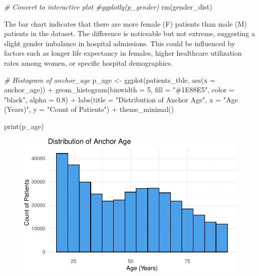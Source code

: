 \documentclass[
]{article}
\newenvironment{Shaded}{\begin{snugshade}}{\end{snugshade}}
\newcommand{\AttributeTok}[1]{\textcolor[rgb]{0.77,0.63,0.00}{#1}}
\newcommand{\CommentTok}[1]{\textcolor[rgb]{0.56,0.35,0.01}{\textit{#1}}}
\newcommand{\DecValTok}[1]{\textcolor[rgb]{0.00,0.00,0.81}{#1}}
\newcommand{\FloatTok}[1]{\textcolor[rgb]{0.00,0.00,0.81}{#1}}
\newcommand{\FunctionTok}[1]{\textcolor[rgb]{0.00,0.00,0.00}{#1}}
\newcommand{\NormalTok}[1]{\textcolor[rgb]{0.00,0.00,0.00}{#1}}
\newcommand{\OtherTok}[1]{\textcolor[rgb]{0.56,0.35,0.01}{#1}}
\newcommand{\SpecialCharTok}[1]{\textcolor[rgb]{0.00,0.00,0.00}{#1}}
\newcommand{\StringTok}[1]{\textcolor[rgb]{0.31,0.60,0.02}{#1}}
\begin{document}
\begin{Shaded}
\begin{Highlighting}[]
\CommentTok{\# Convert to interactive plot}
\CommentTok{\#ggplotly(p\_gender)}
\FunctionTok{rm}\NormalTok{(gender\_dist)}
\end{Highlighting}
\end{Shaded}

The bar chart indicates that there are more female (F) patients than
male (M) patients in the dataset. The difference is noticeable but not
extreme, suggesting a slight gender imbalance in hospital admissions.
This could be influenced by factors such as longer life expectancy in
females, higher healthcare utilization rates among women, or specific
hospital demographics.

\begin{Shaded}
\begin{Highlighting}[]
\CommentTok{\# Histogram of anchor\_age}
\NormalTok{p\_age }\OtherTok{\textless{}{-}} \FunctionTok{ggplot}\NormalTok{(patients\_tble, }\FunctionTok{aes}\NormalTok{(}\AttributeTok{x =}\NormalTok{ anchor\_age)) }\SpecialCharTok{+}
  \FunctionTok{geom\_histogram}\NormalTok{(}\AttributeTok{binwidth =} \DecValTok{5}\NormalTok{, }\AttributeTok{fill =} \StringTok{"\#1E88E5"}\NormalTok{, }
                 \AttributeTok{color =} \StringTok{"black"}\NormalTok{, }\AttributeTok{alpha =} \FloatTok{0.8}\NormalTok{) }\SpecialCharTok{+}
  \FunctionTok{labs}\NormalTok{(}\AttributeTok{title =} \StringTok{"Distribution of Anchor Age"}\NormalTok{,}
       \AttributeTok{x =} \StringTok{"Age (Years)"}\NormalTok{,}
       \AttributeTok{y =} \StringTok{"Count of Patients"}\NormalTok{) }\SpecialCharTok{+}
  \FunctionTok{theme\_minimal}\NormalTok{()}

\FunctionTok{print}\NormalTok{(p\_age)}
\end{Highlighting}
\end{Shaded}

\begin{figure}[H]

{\centering \includegraphics{hw3_files/figure-pdf/unnamed-chunk-30-1.pdf}

}

\end{figure}
\end{document}
